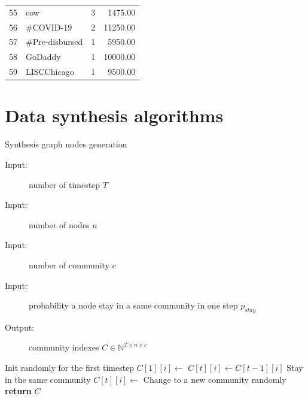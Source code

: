 \begin{longtable}{|c|l|r|r|}
	55          & cow                              & 3                      & 1475.00                      \\
	56          & \#COVID-19                       & 2                      & 11250.00                     \\
	57          & \#Pre-disbursed                  & 1                      & 5950.00                      \\
	58          & GoDaddy                          & 1                      & 10000.00                     \\
	59          & LISCChicago                      & 1                      & 9500.00                      \\
\end{longtable}


\chapter{Data synthesis algorithms}

\begin{algorithm}
	\noindent
	\caption{Synthesis graph nodes generation}
	\label{alg:appendix-synthesis_graph_nodes}
	\begin{description}
		\item[Input:] number of timestep $T$
		\item[Input:] number of nodes $n$
		\item[Input:] number of community $c$
		\item[Input:] probability a node stay in a same community in one step $p_{stay}$
		\item[Output:] community indexes $C \in \mathbb{N}^{T \times n \times c}$
	\end{description}
	\begin{algorithmic}[1]
		\Comment Init randomly for the first timestep
		\State $C[1][i] \gets$ 
		\EndFor
		\State $C[t][i] \gets C[t-1][i]$
		\Comment Stay in the same community
		\Else
		\State $C[t][i] \gets$ 
		\Comment Change to a new community randomly
		\EndIf
		\EndFor
		\EndFor
		\State \textbf{return} $C$
		\EndFunction
	\end{algorithmic}
\end{algorithm}


